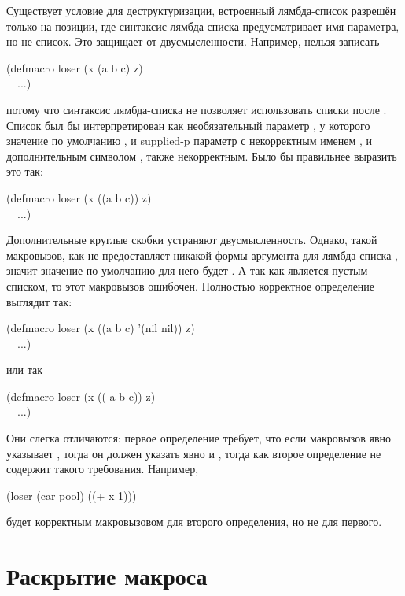 \begin{defmac}
Существует условие для деструктуризации, встроенный лямбда-список разрешён
только на позиции, где синтаксис лямбда-списка предусматривает имя параметра, но
не список. Это защищает от двусмысленности. Например, нельзя записать
\begin{lisp}
(defmacro loser (x  (a b  c)  z) \\
~~...)
\end{lisp}
потому что синтаксис лямбда-списка не позволяет использовать списки после
. Список  был бы интерпретирован как
необязательный параметр , у которого значение по умолчанию , и
supplied-p параметр с некорректным именем , и дополнительным символом
, также некорректным. Было бы правильнее выразить это так:
\begin{lisp}
(defmacro loser (x  ((a b  c))  z) \\
~~...)
\end{lisp}
Дополнительные круглые скобки устраняют двусмысленность. Однако, такой
макровызов, как  не предоставляет никакой формы аргумента
для лямбда-списка  , значит значение по умолчанию для
него будет {\nil}. А так как {\nil} является пустым списком, то этот макровызов
ошибочен. Полностью корректное определение выглядит так:
\begin{lisp}
(defmacro loser (x  ((a b  c) '(nil nil))  z) \\
~~...)
\end{lisp}
или так
\begin{lisp}
(defmacro loser (x  (( a b  c))  z) \\
~~...)
\end{lisp}
Они слегка отличаются: первое определение требует, что если макровызов явно
указывает , тогда он должен указать явно и , тогда как второе
определение не содержит такого требования. Например,
\begin{lisp}
(loser (car pool) ((+ x 1)))
\end{lisp}
будет корректным макровызовом для второго определения, но не для первого.
\end{defmac}

\section{Раскрытие макроса}

